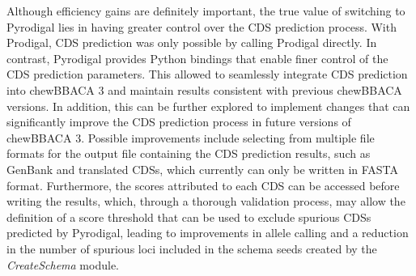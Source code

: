 Although efficiency gains are definitely important, the true value of switching to Pyrodigal lies in having greater control over the \ac{CDS} prediction process. With Prodigal, \ac{CDS} prediction was only possible by calling Prodigal directly. In contrast, Pyrodigal provides Python bindings that enable finer control of the \ac{CDS} prediction parameters. This allowed to seamlessly integrate \ac{CDS} prediction into chewBBACA 3 and maintain results consistent with previous chewBBACA versions. In addition, this can be further explored to implement changes that can significantly improve the \ac{CDS} prediction process in future versions of chewBBACA 3. Possible improvements include selecting from multiple file formats for the output file containing the \ac{CDS} prediction results, such as GenBank and translated \ac{CDSs}, which currently can only be written in FASTA format. Furthermore, the scores attributed to each \ac{CDS} can be accessed before writing the results, which, through a thorough validation process, may allow the definition of a score threshold that can be used to exclude spurious \ac{CDSs} predicted by Pyrodigal, leading to improvements in allele calling and a reduction in the number of spurious loci included in the schema seeds created by the \textit{CreateSchema} module.

